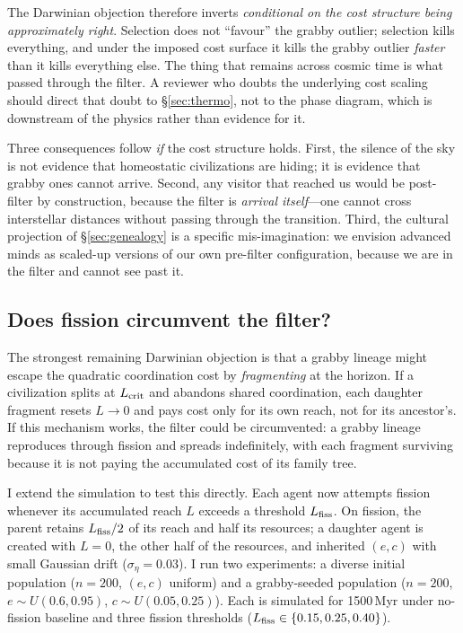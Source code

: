 \documentclass[11pt,a4paper,twocolumn]{article}
\begin{document}
The Darwinian objection therefore inverts \emph{conditional on the
cost structure being approximately right}. Selection does not
``favour'' the grabby outlier; selection kills everything, and under
the imposed cost surface it kills the grabby outlier \emph{faster}
than it kills everything else. The thing that remains across cosmic
time is what passed through the filter. A reviewer who doubts the
underlying cost scaling should direct that doubt to
\S\ref{sec:thermo}, not to the phase diagram, which is downstream of
the physics rather than evidence for it.

Three consequences follow \emph{if} the cost structure holds. First,
the silence of the sky is not evidence that homeostatic civilizations
are hiding; it is evidence that grabby ones cannot arrive. Second,
any visitor that reached us would be post-filter by construction,
because the filter is \emph{arrival itself}---one cannot cross
interstellar distances without passing through the transition. Third,
the cultural projection of \S\ref{sec:genealogy} is a specific
mis-imagination: we envision advanced minds as scaled-up versions of
our own pre-filter configuration, because we are in the filter and
cannot see past it.

\subsection{Does fission circumvent the filter?}
\label{sec:fission}

The strongest remaining Darwinian objection is that a grabby lineage
might escape the quadratic coordination cost by \emph{fragmenting}
at the horizon. If a civilization splits at $L_{\rm crit}$ and
abandons shared coordination, each daughter fragment resets $L
\to 0$ and pays cost only for its own reach, not for its ancestor's.
If this mechanism works, the filter could be circumvented: a grabby
lineage reproduces through fission and spreads indefinitely, with
each fragment surviving because it is not paying the accumulated
cost of its family tree.

I extend the simulation to test this directly. Each agent now
attempts fission whenever its accumulated reach $L$ exceeds a
threshold $L_{\rm fiss}$. On fission, the parent retains
$L_{\rm fiss}/2$ of its reach and half its resources; a daughter
agent is created with $L=0$, the other half of the resources, and
inherited $(e, c)$ with small Gaussian drift ($\sigma_\eta = 0.03$).
I run two experiments: a diverse initial population ($n=200$,
$(e, c)$ uniform) and a grabby-seeded population ($n=200$, $e
\sim U(0.6, 0.95)$, $c \sim U(0.05, 0.25)$). Each is simulated for
1500\,Myr under no-fission baseline and three fission thresholds
($L_{\rm fiss} \in \{0.15, 0.25, 0.40\}$).
\end{document}
